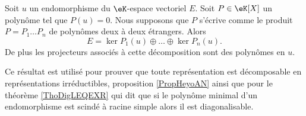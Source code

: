 \begin{theorem}       \label{ThoDecompNoyayzzMWod}
    Soit \( u\) un endomorphisme du \( \eK\)-espace vectoriel \( E\). Soit \( P\in\eK[X]\) un polynôme tel que \( P(u)=0\). Nous supposons que \( P\) s'écrive comme le produit \( P=P_1\ldots P_n\) de polynômes deux à deux étrangers. Alors
    \begin{equation}
        E=\ker P_1(u)\oplus\ldots\oplus\ker P_n(u).
    \end{equation}
    De plus les projecteurs associés à cette décomposition sont des polynômes en \( u\).
\end{theorem}
Ce résultat est utilisé pour prouver que toute représentation est décomposable en représentations irréductibles, proposition \ref{PropHeyoAN} ainsi que pour le théorème \ref{ThoDigLEQEXR} qui dit que si le polynôme minimal d'un endomorphisme est scindé à racine simple alors il est diagonalisable.

